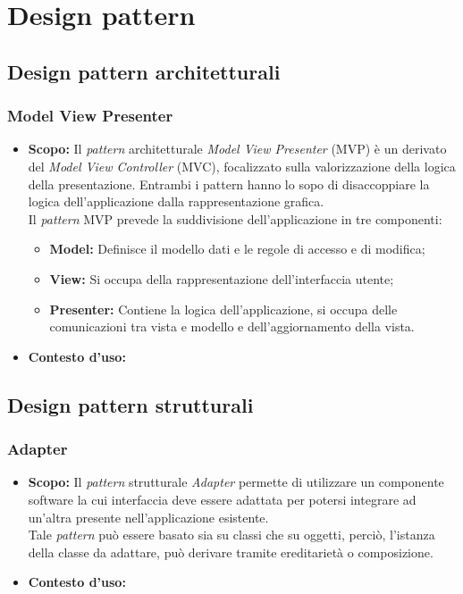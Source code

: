\section{Design pattern}

\subsection{Design pattern architetturali}

\subsubsection{Model View Presenter}
\begin{itemize}
\item \textbf{Scopo:}
Il \textit{pattern} architetturale \textit{Model View Presenter} (MVP) è un derivato del \textit{Model View Controller} (MVC), focalizzato sulla valorizzazione della logica della presentazione. Entrambi i pattern hanno lo sopo di disaccoppiare la logica dell'applicazione dalla rappresentazione grafica.\\
Il \textit{pattern} MVP prevede la suddivisione dell'applicazione in tre componenti:
\begin{itemize}
\item \textbf{Model:} Definisce il modello dati e le regole di accesso e di modifica;
\item \textbf{View:} Si occupa della rappresentazione dell'interfaccia utente;
\item \textbf{Presenter:} Contiene la logica dell'applicazione, si occupa delle comunicazioni tra vista e modello e dell'aggiornamento della vista.
\end{itemize}

\item \textbf{Contesto d'uso:}
\end{itemize}

\subsection{Design pattern strutturali}
\subsubsection{Adapter}
\begin{itemize}
\item \textbf{Scopo:}
Il \textit{pattern} strutturale \textit{Adapter} permette di utilizzare un componente software la cui interfaccia deve essere adattata per potersi integrare ad un'altra presente nell'applicazione esistente.\\
Tale \textit{pattern} può essere basato sia su classi che su oggetti, perciò, l'istanza della classe da adattare, può derivare tramite ereditarietà o composizione.

\item \textbf{Contesto d'uso:}
\end{itemize}

